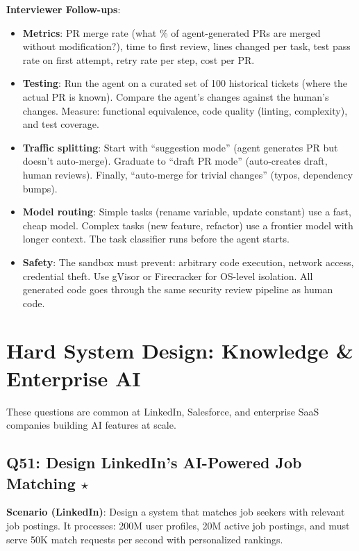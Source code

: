 \textbf{Interviewer Follow-ups}:
\begin{itemize}[leftmargin=*]
    \item \textbf{Metrics}: PR merge rate (what \% of agent-generated PRs are merged without modification?), time to first review, lines changed per task, test pass rate on first attempt, retry rate per step, cost per PR.
    \item \textbf{Testing}: Run the agent on a curated set of 100 historical tickets (where the actual PR is known). Compare the agent's changes against the human's changes. Measure: functional equivalence, code quality (linting, complexity), and test coverage.
    \item \textbf{Traffic splitting}: Start with ``suggestion mode'' (agent generates PR but doesn't auto-merge). Graduate to ``draft PR mode'' (auto-creates draft, human reviews). Finally, ``auto-merge for trivial changes'' (typos, dependency bumps).
    \item \textbf{Model routing}: Simple tasks (rename variable, update constant) use a fast, cheap model. Complex tasks (new feature, refactor) use a frontier model with longer context. The task classifier runs before the agent starts.
    \item \textbf{Safety}: The sandbox must prevent: arbitrary code execution, network access, credential theft. Use gVisor or Firecracker for OS-level isolation. All generated code goes through the same security review pipeline as human code.
\end{itemize}


\section{Hard System Design: Knowledge \& Enterprise AI}
\label{sec:hard-enterprise}

These questions are common at LinkedIn, Salesforce, and enterprise SaaS companies building AI features at scale.

\subsection{Q51: Design LinkedIn's AI-Powered Job Matching $\star$}

\textbf{Scenario (LinkedIn)}: Design a system that matches job seekers with relevant job postings. It processes: 200M user profiles, 20M active job postings, and must serve 50K match requests per second with personalized rankings.

